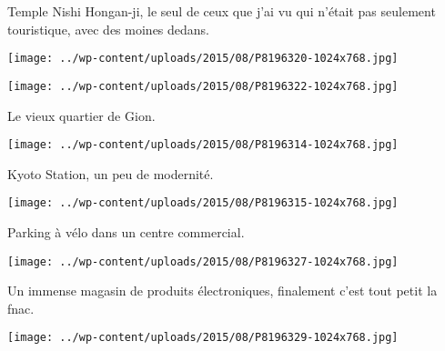  Temple Nishi Hongan-ji, le seul de ceux que j'ai vu qui n'était pas seulement touristique, avec des moines dedans.
\begin{center} \texttt{[image: ../wp-content/uploads/2015/08/P8196320-1024x768.jpg]} \end{center}
\begin{center} \texttt{[image: ../wp-content/uploads/2015/08/P8196322-1024x768.jpg]} \end{center}

 Le vieux quartier de Gion.
\begin{center} \texttt{[image: ../wp-content/uploads/2015/08/P8196314-1024x768.jpg]} \end{center}

\pagebreak
 Kyoto Station, un peu de modernité.
\begin{center} \texttt{[image: ../wp-content/uploads/2015/08/P8196315-1024x768.jpg]} \end{center}

 Parking à vélo dans un centre commercial.
\begin{center} \texttt{[image: ../wp-content/uploads/2015/08/P8196327-1024x768.jpg]} \end{center}

\pagebreak
 Un immense magasin de produits électroniques, finalement c'est tout petit la fnac. 
\begin{center} \texttt{[image: ../wp-content/uploads/2015/08/P8196329-1024x768.jpg]} \end{center}
